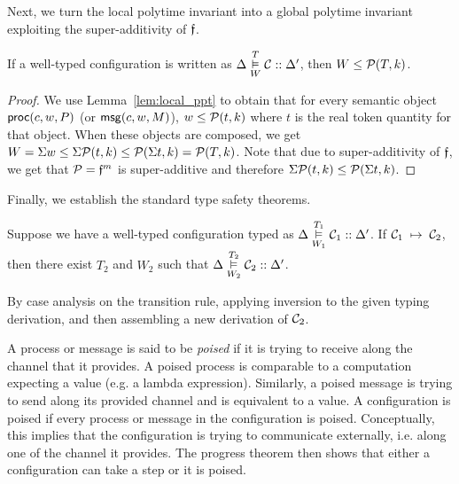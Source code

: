 Next, we turn the local polytime invariant into a global polytime invariant exploiting
the super-additivity of $\mathfrak{f}$.

\begin{theorem} \label{thm:global_ppt}
  If a well-typed configuration is written as $\Delta \overset{T}{\underset{W}{\vDash}} \mathcal{C} :: \Delta'$,
  then $W \leq \mathcal{P}(T, k)$.
\end{theorem}

\begin{proof}
  We use Lemma~\ref{lem:local_ppt} to obtain that for every semantic object $\mathsf{proc}(c, w, P)$ (or $\mathsf{msg}(c, w, M)$),
  $w \leq \mathcal{P}(t, k)$ where $t$ is the real token quantity for that object.
  When these objects are composed, we get $W = \Sigma w \leq \Sigma \mathcal{P}(t, k) \leq
  \mathcal{P}(\Sigma t, k) = \mathcal{P}(T, k)$.
  Note that due to super-additivity of $\mathfrak{f}$, we get that $\mathcal{P} = \mathfrak{f}^m$ is super-additive
  and therefore $\Sigma \mathcal{P}(t, k) \leq \mathcal{P}(\Sigma t, k)$.
\end{proof}

Finally, we establish the standard type safety theorems.

\begin{theorem}
\label{thm:preservation}
Suppose we have a well-typed configuration typed as
$\Delta \overset{T_1}{\underset{W_1}{\vDash}} \mathcal{C}_1 :: \Delta'$.
If $\mathcal{C}_1 \; \mapsto \; \mathcal{C}_2$, then there exist $T_2$ and $W_2$ such
that $\Delta \overset{T_2}{\underset{W_2}{\vDash}} \mathcal{C}_2 :: \Delta'$.
\end{theorem}
\begin{proofsketch}
  By case analysis on the transition rule, applying inversion to the
  given typing derivation, and then assembling a new derivation of
  $\mathcal{C}_2$.
\end{proofsketch}

A process or message is said to be \emph{poised} if it is trying to
receive along the channel that it provides.  A poised process is
comparable to a computation expecting a value (e.g. a lambda expression).
Similarly, a poised message is trying to send along its provided channel and is equivalent to a value.
A configuration is poised if every process or message in the configuration is poised.
Conceptually, this implies that the configuration is trying to communicate
externally, i.e. along one of the channel it provides.
The progress theorem then shows that either a configuration can take a
step or it is poised.


